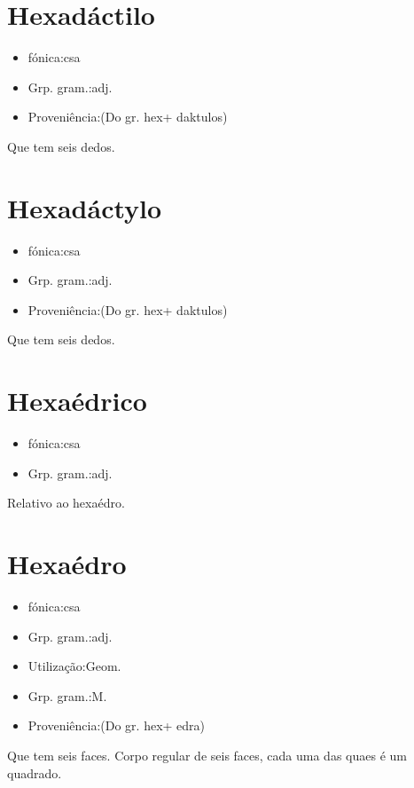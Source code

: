 \documentclass{article}
\begin{document}
\section{Hexadáctilo}
\begin{itemize}
\item {fónica:csa}
\end{itemize}
\begin{itemize}
\item {Grp. gram.:adj.}
\end{itemize}
\begin{itemize}
\item {Proveniência:(Do gr. \textunderscore hex\textunderscore  + \textunderscore daktulos\textunderscore )}
\end{itemize}
Que tem seis dedos.
\section{Hexadáctylo}
\begin{itemize}
\item {fónica:csa}
\end{itemize}
\begin{itemize}
\item {Grp. gram.:adj.}
\end{itemize}
\begin{itemize}
\item {Proveniência:(Do gr. \textunderscore hex\textunderscore  + \textunderscore daktulos\textunderscore )}
\end{itemize}
Que tem seis dedos.
\section{Hexaédrico}
\begin{itemize}
\item {fónica:csa}
\end{itemize}
\begin{itemize}
\item {Grp. gram.:adj.}
\end{itemize}
Relativo ao hexaédro.
\section{Hexaédro}
\begin{itemize}
\item {fónica:csa}
\end{itemize}
\begin{itemize}
\item {Grp. gram.:adj.}
\end{itemize}
\begin{itemize}
\item {Utilização:Geom.}
\end{itemize}
\begin{itemize}
\item {Grp. gram.:M.}
\end{itemize}
\begin{itemize}
\item {Proveniência:(Do gr. \textunderscore hex\textunderscore  + \textunderscore edra\textunderscore )}
\end{itemize}
Que tem seis faces.
Corpo regular de seis faces, cada uma das quaes é um quadrado.
\end{document}
